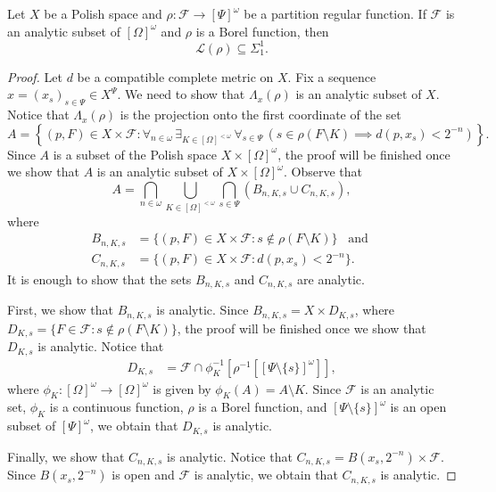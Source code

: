 \documentclass[10pt,a4paper]{amsart}
\newcommand{\F}{\cF}
\newcommand{\cF}{\mathcal{F}}
\begin{document}
\begin{prop}
\label{continous_implies_analytic}
Let $X$ be a Polish space and  
$\rho:\mathcal F\to[\Psi]^\omega$
be a partition regular function.
If $\F$ is an analytic subset of $[\Omega]^\omega$ and $\rho$ is a Borel function, then 
\begin{equation*}
    \mathscr{L}(\rho)\subseteq \Sigma^1_1.
\end{equation*}
\end{prop}

\begin{proof}
Let $d$ be a compatible complete metric on $X$.
Fix a sequence $x=(x_s)_{s\in\Psi}\in X^\Psi$. We need to show that $\Lambda_x(\rho)$ is an analytic subset of $X$. 
Notice that  $\Lambda_{x}(\rho)$ is the projection onto the first coordinate of the set
\begin{equation*}
    A = \left\{(p,F)\in X\times \cF: \forall_{n\in \omega}\, \exists_{K\in [\Omega]^{<\omega}}\, \forall_{s\in \Psi}\, (s\in \rho(F\setminus K)\implies d(p,x_s)<2^{-n})\right\}.
\end{equation*}
Since $A$ is a subset of the Polish space $X\times [\Omega]^\omega$,  the proof will be finished once we show that $A$ is an analytic subset of $X\times [\Omega]^\omega$.
Observe that
\begin{equation*}
    A = \bigcap_{n\in \omega}\bigcup_{K\in [\Omega]^{<\omega}}\bigcap_{s\in \Psi} (B_{n,K,s}\cup C_{n,K,s}),
\end{equation*}
where 
\begin{equation*}
\begin{split}
    B_{n,K,s} &= \{(p,F)\in X\times\cF:s\notin \rho(F\setminus K)\} \,\,\,\text{ and }
    \\
    C_{n,K,s}&=\{(p,F)\in X\times\cF: d(p,x_s)<2^{-n}\}.
\end{split}
\end{equation*}
It is enough to show that the sets $B_{n,K,s}$ and $C_{n,K,s}$ are analytic. 

First, we show that $B_{n,K,s}$ is analytic.
Since 
$B_{n,K,s}=X\times D_{K,s}$, 
where 
$D_{K,s} = \{F\in \cF:s\notin \rho(F\setminus K)\}$, 
the proof will be finished once we show that 
$D_{K,s}$ is analytic.
Notice that 
\begin{equation*}
    \begin{split}
D_{K,s}
&=
\cF\cap \phi^{-1}_K\left[\rho^{-1}\left[\left[\Psi\setminus\{s\}\right]^\omega\right]\right],
    \end{split}
\end{equation*}
where $\phi_K:[\Omega]^\omega\to [\Omega]^\omega$ is given by $\phi_K(A)=A\setminus K$.
Since 
$\cF$ is an analytic set, 
$\phi_K$  is a continuous function, $\rho$ is a Borel function,  
and $\left[\Psi\setminus\{s\}\right]^\omega$ is an open subset of $[\Psi]^\omega$, we obtain that $D_{K,s}$ is analytic.


Finally, we show that $C_{n,K,s}$ is analytic.
Notice that 
$C_{n,K,s}=B(x_s,2^{-n})\times \cF$.
Since $B(x_s,2^{-n})$ is open and $\cF$ is analytic, we obtain that $C_{n,K,s}$ is analytic. 
\end{proof}
\end{document}
